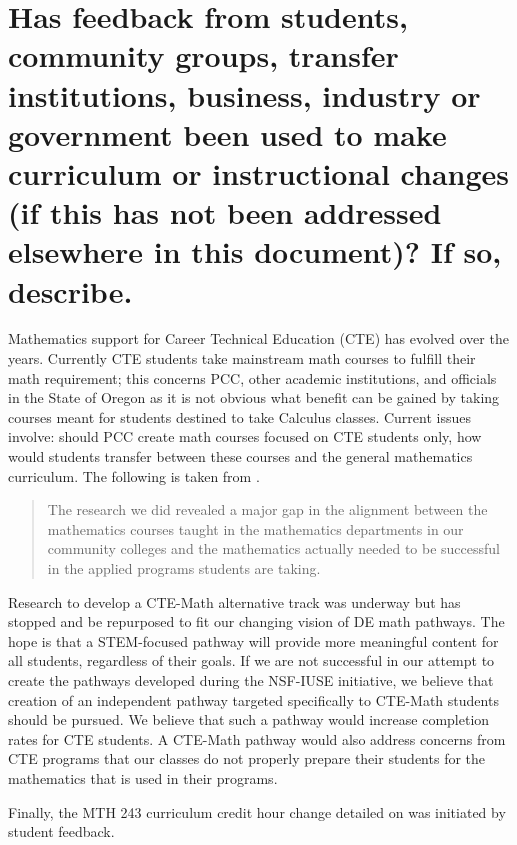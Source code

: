 \section[Curriculum/instructional changes due to internal/external
  feedback]{Has feedback from students, community groups, transfer institutions,
  business, industry or government been used to make curriculum or instructional
  changes (if this has not been addressed elsewhere in this document)?
  If so, describe.
 }
Mathematics support for Career Technical Education (CTE) has evolved over the years.
Currently CTE students take mainstream math courses to fulfill their math requirement;  this concerns PCC, other academic institutions, and officials in the State of Oregon as it is not obvious what benefit can be gained by taking courses meant for students destined to take Calculus classes.
Current issues involve: should PCC create math courses focused on CTE students only, how would students  transfer between these courses and the general mathematics curriculum.
The following is taken from \cite{natcentereduc}.
\begin{quote}
	The research we did revealed a major gap in the alignment between the mathematics courses taught in the mathematics departments in our community colleges and the mathematics actually needed to be successful in the applied programs students are taking.
\end{quote}
Research to develop a CTE-Math alternative track was underway but has stopped and be repurposed to fit our changing vision of DE math pathways.
The hope is that a STEM-focused  pathway will provide more meaningful content for all students, regardless of their goals.
If we are not successful in our attempt to create the pathways developed during the NSF-IUSE initiative, we believe that creation of an independent pathway targeted specifically to CTE-Math students should be pursued.
We believe that such a pathway would increase completion rates for CTE students.
A CTE-Math pathway would also address concerns from CTE programs that our classes do not properly prepare their students for the mathematics that is used in their programs.

Finally, the MTH 243 curriculum credit hour change detailed on  was initiated by student feedback.

